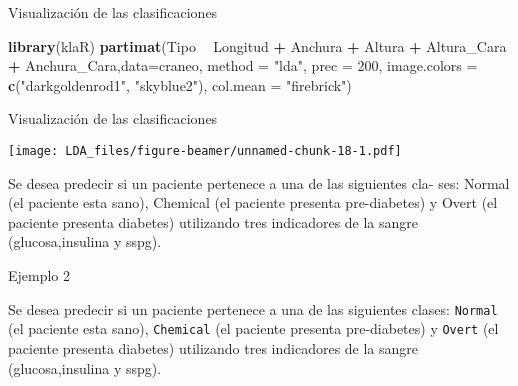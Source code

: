 \documentclass[ignorenonframetext,]{beamer}
\newenvironment{Shaded}{\begin{snugshade}}{\end{snugshade}}
\newcommand{\KeywordTok}[1]{\textcolor[rgb]{0.13,0.29,0.53}{\textbf{#1}}}
\newcommand{\DataTypeTok}[1]{\textcolor[rgb]{0.13,0.29,0.53}{#1}}
\newcommand{\DecValTok}[1]{\textcolor[rgb]{0.00,0.00,0.81}{#1}}
\newcommand{\StringTok}[1]{\textcolor[rgb]{0.31,0.60,0.02}{#1}}
\newcommand{\OperatorTok}[1]{\textcolor[rgb]{0.81,0.36,0.00}{\textbf{#1}}}
\newcommand{\NormalTok}[1]{#1}
\begin{document}
\begin{frame}[fragile]{Visualización de las clasificaciones}

\begin{Shaded}
\begin{Highlighting}[]
\KeywordTok{library}\NormalTok{(klaR)}
\KeywordTok{partimat}\NormalTok{(Tipo }\OperatorTok{~}\StringTok{ }\NormalTok{Longitud }\OperatorTok{+}\StringTok{ }\NormalTok{Anchura }\OperatorTok{+}\StringTok{ }\NormalTok{Altura }\OperatorTok{+}\StringTok{ }\NormalTok{Altura_Cara }\OperatorTok{+}\StringTok{ }\NormalTok{Anchura_Cara,}\DataTypeTok{data=}\NormalTok{craneo, }\DataTypeTok{method =} \StringTok{"lda"}\NormalTok{, }\DataTypeTok{prec =} \DecValTok{200}\NormalTok{,}
         \DataTypeTok{image.colors =} \KeywordTok{c}\NormalTok{(}\StringTok{"darkgoldenrod1"}\NormalTok{, }\StringTok{"skyblue2"}\NormalTok{),}
         \DataTypeTok{col.mean =} \StringTok{"firebrick"}\NormalTok{)}
\end{Highlighting}
\end{Shaded}

\end{frame}

\begin{frame}{Visualización de las clasificaciones}

\texttt{[image: LDA\_files/figure-beamer/unnamed-chunk-18-1.pdf]}

Se desea predecir si un paciente pertenece a una de las siguientes cla-
ses: Normal (el paciente esta sano), Chemical (el paciente presenta
pre-diabetes) y Overt (el paciente presenta diabetes) utilizando tres
indicadores de la sangre (glucosa,insulina y sspg).

\end{frame}

\begin{frame}[fragile]{Ejemplo 2}

Se desea predecir si un paciente pertenece a una de las siguientes
clases: \texttt{Normal} (el paciente esta sano), \texttt{Chemical} (el
paciente presenta pre-diabetes) y \texttt{Overt} (el paciente presenta
diabetes) utilizando tres indicadores de la sangre (glucosa,insulina y
sspg).

\end{frame}
\end{document}
